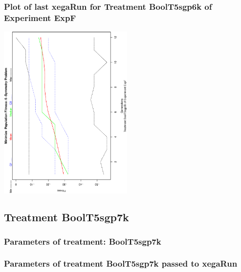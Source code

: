 \documentclass[18pt,c]{beamer}
\begin{document}
 \begin{frame}
 \frametitle{ Plot of last xegaRun for Treatment BoolT5sgp6k of Experiment ExpF }
 \begin{center}
\includegraphics[width=0.5\textwidth, angle=-90]
{ExpFPlotPopStatsFigure007.eps}
 \end{center}
 \label{report/ExpFPlotPopStatsFigure007.eps}  
 \end{frame}

\clearpage
\subsection{Treatment BoolT5sgp7k}

 \begin{frame}
 \fontsize{8pt}{9pt}\selectfont
 \frametitle{  Parameters of treatment: BoolT5sgp7k 
 }

 \label{ExpFtParmTable032.tex}  
 \end{frame}


 \begin{frame}
 \fontsize{8pt}{9pt}\selectfont
 \frametitle{  Parameters of treatment BoolT5sgp7k passed to xegaRun
 }

 \label{ExpFtParmTable033.tex}  
 \end{frame}
\end{document}
